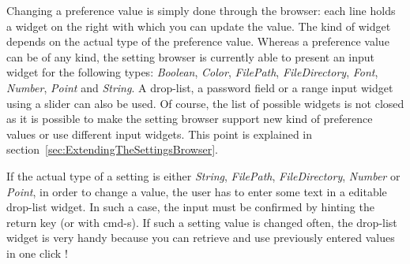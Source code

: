 \documentclass[a4paper,10pt,twoside]{book}
\begin{document}
Changing a preference value is simply done through the browser: each line holds a widget on the right with which you can update the value. The kind of widget depends on the actual type of the preference value. Whereas a preference value can be of any kind, the setting browser is currently able to present an input widget for the following types: \textit{Boolean}, \textit{Color}, \textit{FilePath}, \textit{FileDirectory}, \textit{Font}, \textit{Number}, \textit{Point} and \textit{String}. A drop-list, a password field or a range input widget using a slider can also be used. Of course, the list of possible widgets is not closed as it is possible to make the setting browser support new kind of preference values or use different input widgets. This point is explained in section~\ref{sec:ExtendingTheSettingsBrowser}.

If the actual type of a setting is either \textit{String}, \textit{FilePath}, \textit{FileDirectory}, \textit{Number} or \textit{Point}, in order to change a value, the user has to enter some text in a editable drop-list widget. In such a case, the input must be confirmed by hinting the return key (or with cmd-s). If such a setting value is changed often, the drop-list widget is very handy because you can retrieve and use previously entered values in one click !
\end{document}

